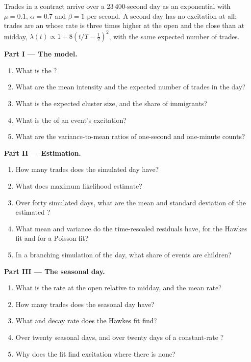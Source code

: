 \begin{problem}\label{pb:qm:point-processes-and-hawkes-processes:1}
Trades in a contract arrive over a 23\,400-second day as an exponential  with $\mu = 0.1$, $\alpha =
0.7$ and $\beta = 1$ per second. A second day has no excitation at all: trades are an 
whose rate is three times higher at the open and the close than at midday, $\lambda(t) \propto 1 + 8(t/T -
\tfrac12)^2$, with the same expected number of trades.

\medskip\noindent\textbf{Part I --- The model.}
\begin{enumerate}
\item What is the ?
\item What are the mean intensity and the expected number of trades in the day?
\item What is the expected cluster size, and the share of immigrants?
\item What is the  of an event's excitation?
\item What are the variance-to-mean ratios of one-second and one-minute counts?
\end{enumerate}

\medskip\noindent\textbf{Part II --- Estimation.}
\begin{enumerate}[resume]
\item How many trades does the simulated day have?
\item What does maximum likelihood estimate?
\item Over forty simulated days, what are the mean and standard deviation of the estimated ?
\item What mean and variance do the time-rescaled residuals have, for the Hawkes fit and for a Poisson fit?
\item In a branching simulation of the day, what share of events are children?
\end{enumerate}

\medskip\noindent\textbf{Part III --- The seasonal day.}
\begin{enumerate}[resume]
\item What is the rate at the open relative to midday, and the mean rate?
\item How many trades does the seasonal day have?
\item What  and decay rate does the Hawkes fit find?
\item Over twenty seasonal days, and over twenty days of a constant-rate ?
\item Why does the fit find excitation where there is none?
\end{enumerate}


\end{problem}
